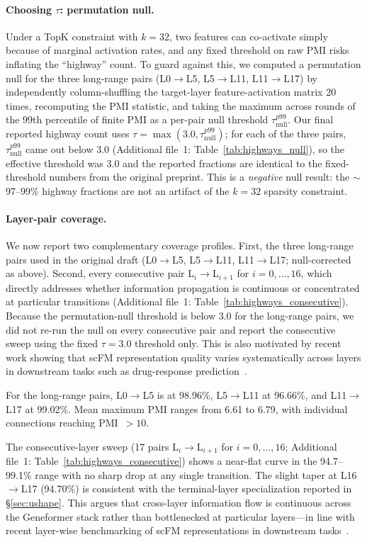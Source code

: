 \documentclass[onecolumn]{article}
\begin{document}
\paragraph{Choosing $\tau$: permutation null.} Under a TopK constraint with $k{=}32$, two features can co-activate simply because of marginal activation rates, and any fixed threshold on raw PMI risks inflating the ``highway'' count. To guard against this, we computed a permutation null for the three long-range pairs (L0$\to$L5, L5$\to$L11, L11$\to$L17) by independently column-shuffling the target-layer feature-activation matrix 20 times, recomputing the PMI statistic, and taking the maximum across rounds of the 99th percentile of finite PMI as a per-pair null threshold $\tau_{\text{null}}^{p99}$. Our final reported highway count uses $\tau = \max(3.0, \tau_{\text{null}}^{p99})$; for each of the three pairs, $\tau_{\text{null}}^{p99}$ came out below 3.0 (Additional file~1: Table~\ref{tab:highways_null}), so the effective threshold was 3.0 and the reported fractions are identical to the fixed-threshold numbers from the original preprint. This is a \emph{negative} null result: the $\sim$97--99\% highway fractions are not an artifact of the $k{=}32$ sparsity constraint.

\paragraph{Layer-pair coverage.} We now report two complementary coverage profiles. First, the three long-range pairs used in the original draft (L0$\to$L5, L5$\to$L11, L11$\to$L17; null-corrected as above). Second, every consecutive pair L$_{i}$$\to$L$_{i+1}$ for $i=0,\dots,16$, which directly addresses whether information propagation is continuous or concentrated at particular transitions (Additional file~1: Table~\ref{tab:highways_consecutive}). Because the permutation-null threshold is below 3.0 for the long-range pairs, we did not re-run the null on every consecutive pair and report the consecutive sweep using the fixed $\tau{=}3.0$ threshold only. This is also motivated by recent work showing that scFM representation quality varies systematically across layers in downstream tasks such as drug-response prediction~\cite{wang2025scdrugmap}.

For the long-range pairs, L0$\to$L5 is at 98.96\%, L5$\to$L11 at 96.66\%, and L11$\to$L17 at 99.02\%. Mean maximum PMI ranges from 6.61 to 6.79, with individual connections reaching PMI~$> 10$.

The consecutive-layer sweep (17 pairs L$_i$$\to$L$_{i+1}$ for $i = 0, \ldots, 16$; Additional file~1: Table~\ref{tab:highways_consecutive}) shows a near-flat curve in the 94.7--99.1\% range with no sharp drop at any single transition. The slight taper at L16$\to$L17 (94.70\%) is consistent with the terminal-layer specialization reported in \S\ref{sec:ushape}. This argues that cross-layer information flow is continuous across the Geneformer stack rather than bottlenecked at particular layers---in line with recent layer-wise benchmarking of scFM representations in downstream tasks~\cite{wang2025scdrugmap}.
\end{document}
